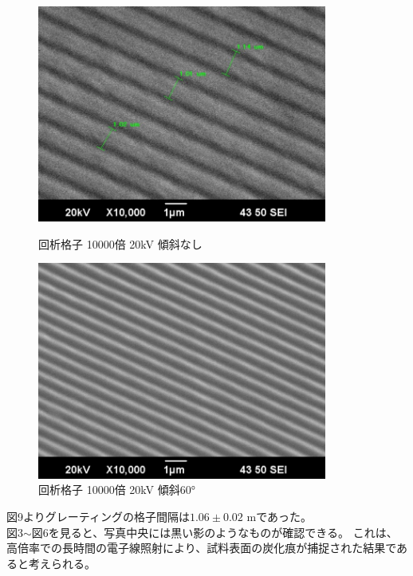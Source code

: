 \documentclass[a4paper,11pt]{jsarticle}
\begin{document}
\begin{figure}[H]
  \begin{minipage}{0.5\hsize}
    \begin{center}
      \includegraphics[width=0.85\textwidth]{figs/0523/kaisetukousi/10000_20kV_re.pdf}
    \end{center}
    \caption{回析格子 10000倍 20kV 傾斜なし}
  \end{minipage}
  \begin{minipage}{0.5\hsize}
    \begin{center}
      \includegraphics[width=0.85\textwidth]{figs/0523/kaisetukousi/10000_20kV_60.pdf}
    \end{center}
    \caption{回析格子 10000倍 20kV 傾斜60°}
  \end{minipage}
\end{figure}
図9よりグレーティングの格子間隔は$1.06\pm 0.02$ \textmu mであった。\\
図3$\sim$図6を見ると、写真中央には黒い影のようなものが確認できる。
これは、高倍率での長時間の電子線照射により、試料表面の炭化痕が捕捉された結果であると考えられる。\\
\end{document}
